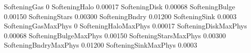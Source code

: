 SofteningGas                    0
SofteningHalo                   0.00017
SofteningDisk                   0.00068
SofteningBulge                  0.00150
SofteningStars                  0.00300
SofteningBndry                  0.01200
SofteningSink                   0.0003
SofteningGasMaxPhys             0
SofteningHaloMaxPhys            0.00017
SofteningDiskMaxPhys            0.00068
SofteningBulgeMaxPhys           0.00150
SofteningStarsMaxPhys           0.00300
SofteningBndryMaxPhys           0.01200
SofteningSinkMaxPhys            0.0003

